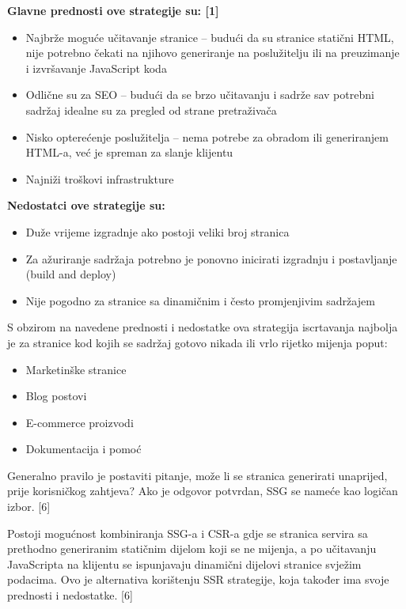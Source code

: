 \bigskip
\textbf{Glavne prednosti ove strategije su: [1]}
\begin{itemize}
    \item Najbrže moguće učitavanje stranice – budući da su stranice statični HTML, nije potrebno čekati na njihovo generiranje na poslužitelju ili na preuzimanje i izvršavanje JavaScript koda
    \item Odlične su za SEO – budući da se brzo učitavanju i sadrže sav potrebni sadržaj idealne su za pregled od strane pretraživača
    \item Nisko opterećenje poslužitelja – nema potrebe za obradom ili generiranjem HTML-a, već je spreman za slanje klijentu
    \item Najniži troškovi infrastrukture
\end{itemize}

\bigskip

\textbf{Nedostatci ove strategije su:}

\begin{itemize}
    \item Duže vrijeme izgradnje ako postoji veliki broj stranica
    \item Za ažuriranje sadržaja potrebno je ponovno inicirati izgradnju i postavljanje (build and deploy)
    \item Nije pogodno za stranice sa dinamičnim i često promjenjivim sadržajem
\end{itemize}

S obzirom na navedene prednosti i nedostatke ova strategija iscrtavanja najbolja je za stranice kod kojih se sadržaj gotovo nikada ili vrlo rijetko mijenja poput:
\begin{itemize}
    \item Marketinške stranice
    \item Blog postovi
    \item E-commerce proizvodi
    \item Dokumentacija i pomoć
\end{itemize}
Generalno pravilo je postaviti pitanje, može li se stranica generirati unaprijed, prije korisničkog zahtjeva? Ako je odgovor potvrdan, SSG se nameće kao logičan izbor. [6]

Postoji mogućnost kombiniranja SSG-a i CSR-a gdje se stranica servira sa prethodno generiranim statičnim dijelom koji se ne mijenja, a po učitavanju JavaScripta na klijentu se ispunjavaju dinamični dijelovi stranice svježim podacima. Ovo je alternativa korištenju SSR strategije, koja također ima svoje prednosti i nedostatke. [6]

